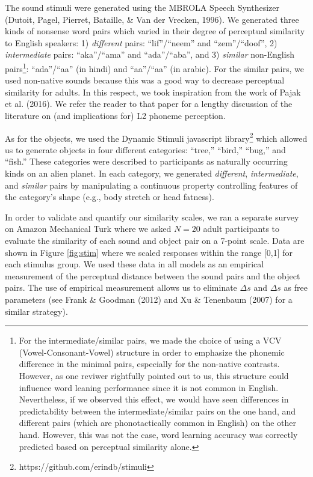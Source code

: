 \documentclass[english,,man]{apa6}
\let\rmarkdownfootnote\footnote%
\def\footnote{\protect\rmarkdownfootnote}
\begin{document}
The sound stimuli were generated using the MBROLA Speech Synthesizer (Dutoit, Pagel, Pierret, Bataille, \& Van der Vrecken, 1996). We generated three kinds of nonsense word pairs which varied in their degree of perceptual similarity to English speakers: 1) \emph{different} pairs: \enquote{lif}/\enquote{neem} and \enquote{zem}/\enquote{doof}, 2) \emph{intermediate} pairs: \enquote{aka}/\enquote{ama} and \enquote{ada}/\enquote{aba}, and 3) \emph{similar} non-English pairs\footnote{For the intermediate/similar pairs, we made the choice of using a VCV (Vowel-Consonant-Vowel) structure in order to emphasize the phonemic difference in the minimal pairs, especially for the non-native contrasts. However, as one reviwer rightfully pointed out to us, this structure could influence word leaning performance since it is not common in English. Nevertheless, if we observed this effect, we would have seen differences in predictability between the intermediate/similar pairs on the one hand, and different pairs (which are phonotactically common in English) on the other hand. However, this was not the case, word learning accuracy was correctly predicted based on perceptual similarity alone.}: \enquote{ada}/\enquote{aa} (in hindi) and \enquote{aa}/\enquote{a\textipa{\textcrh}a} (in arabic). For the similar pairs, we used non-native sounds because this was a good way to decrease perceptual similarity for adults. In this respect, we took inspiration from the work of Pajak et al. (2016). We refer the reader to that paper for a lengthy discussion of the literature on (and implications for) L2 phoneme perception.

As for the objects, we used the Dynamic Stimuli javascript library\footnote{https://github.com/erindb/stimuli} which allowed us to generate objects in four different categories: \enquote{tree,} \enquote{bird,} \enquote{bug,} and \enquote{fish.} These categories were described to participants as naturally occurring kinds on an alien planet. In each category, we generated \emph{different}, \emph{intermediate}, and \emph{similar} pairs by manipulating a continuous property controlling features of the category's shape (e.g., body stretch or head fatness).

In order to validate and quantify our similarity scales, we ran a separate survey on Amazon Mechanical Turk where we asked \(N=20\) adult participants to evaluate the similarity of each sound and object pair on a 7-point scale. Data are shown in Figure \ref{fig:stim} where we scaled responses within the range {[}0,1{]} for each stimulus group. We used these data in all models as an empirical measurement of the perceptual distance between the sound pairs and the object pairs. The use of empirical measurement allows us to eliminate \(\Delta s\) and \(\Delta s\) as free parameters (see Frank \& Goodman (2012) and Xu \& Tenenbaum (2007) for a similar strategy).
\end{document}
